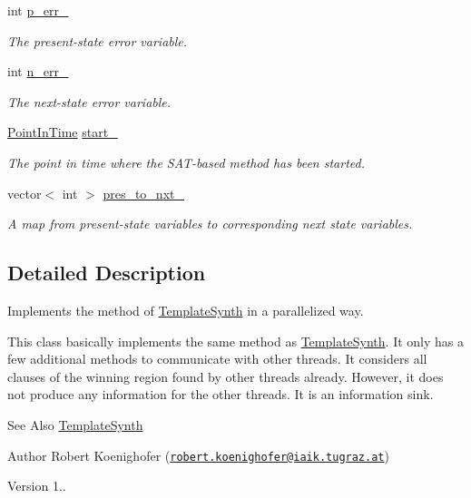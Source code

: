 \begin{DoxyCompactItemize}
int \hyperlink{classTemplExplorer_ad538a0e66b7c0a52de76eea33da7db94}{p\-\_\-err\-\_\-}
\begin{DoxyCompactList}\small\item\em The present-\/state error variable. \end{DoxyCompactList}\item 
int \hyperlink{classTemplExplorer_af4e2d68befa5a10d76614da4cbd5f4f3}{n\-\_\-err\-\_\-}
\begin{DoxyCompactList}\small\item\em The next-\/state error variable. \end{DoxyCompactList}\item 
\hyperlink{Options_8h_af3a9f634f27bed7e98dbc23e5c6f807d}{Point\-In\-Time} \hyperlink{classTemplExplorer_aa22a33001341d2557a0cc66dea2ac890}{start\-\_\-}
\begin{DoxyCompactList}\small\item\em The point in time where the S\-A\-T-\/based method has been started. \end{DoxyCompactList}\item 
vector$<$ int $>$ \hyperlink{classTemplExplorer_a5293c24738857c9af8228336dd675833}{pres\-\_\-to\-\_\-nxt\-\_\-}
\begin{DoxyCompactList}\small\item\em A map from present-\/state variables to corresponding next state variables. \end{DoxyCompactList}\end{DoxyCompactItemize}


\subsection{Detailed Description}
Implements the method of \hyperlink{classTemplateSynth}{Template\-Synth} in a parallelized way. 

This class basically implements the same method as \hyperlink{classTemplateSynth}{Template\-Synth}. It only has a few additional methods to communicate with other threads. It considers all clauses of the winning region found by other threads already. However, it does not produce any information for the other threads. It is an information sink.

\begin{DoxySeeAlso}{See Also}
\hyperlink{classTemplateSynth}{Template\-Synth}
\end{DoxySeeAlso}
\begin{DoxyAuthor}{Author}
Robert Koenighofer (\href{mailto:robert.koenighofer@iaik.tugraz.at}{\tt robert.\-koenighofer@iaik.\-tugraz.\-at}) 
\end{DoxyAuthor}
\begin{DoxyVersion}{Version}
1.. 
\end{DoxyVersion}


